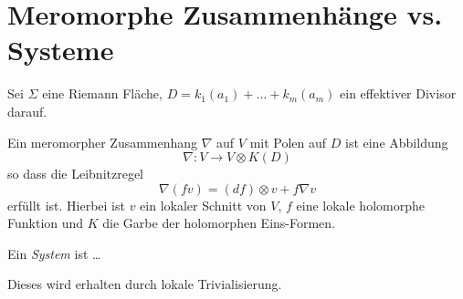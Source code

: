 \section{Meromorphe Zusammenhänge vs. Systeme}
Sei $\Sigma$ eine Riemann Fläche, $D=k_1(a_1)+\dots+k_m(a_m)$ ein effektiver
Divisor darauf.
\begin{paracol}{2}
\begin{defn}
Ein meromorpher Zusammenhang $\nabla$ auf $V$ mit Polen auf $D$ ist eine
Abbildung
\[
  \nabla: V\to V\otimes K(D)
\]
so dass die Leibnitzregel
\begin{equation}
  \nabla(fv)=(df)\otimes v + f\nabla v
\end{equation}
erfüllt ist. Hierbei ist $v$ ein lokaler Schnitt von $V$, $f$ eine lokale
holomorphe Funktion und $K$ die Garbe der holomorphen Eins-Formen.
\end{defn}
\switchcolumn %
\begin{defn}
Ein \emph{System} ist \dots
\end{defn}
Dieses wird erhalten durch lokale Trivialisierung.
\end{paracol}

\begin{paracol}{2}
\begin{defn}
\end{defn}
\switchcolumn %
\begin{defn}
\end{defn}
\end{paracol}
